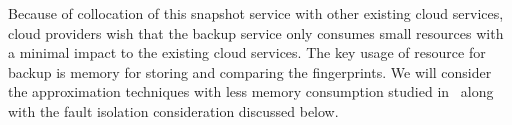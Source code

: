 Because of collocation of this snapshot service with other existing cloud services, 
cloud providers wish that the backup service only consumes  small resources
with a minimal impact to the existing cloud services.
The key usage of resource for backup is memory for storing and comparing the fingerprints. 
We will consider the approximation techniques with less memory consumption
studied in~\cite{extreme_binning09,Guo2011} along with the fault isolation consideration discussed below. 



